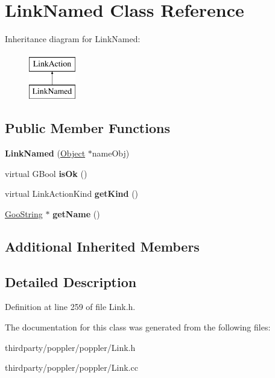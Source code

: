 \hypertarget{class_link_named}{}\section{Link\+Named Class Reference}
\label{class_link_named}
Inheritance diagram for Link\+Named\+:\begin{figure}[H]
\begin{center}
\leavevmode
\includegraphics[height=2.000000cm]{class_link_named}
\end{center}
\end{figure}
\subsection*{Public Member Functions}
\begin{DoxyCompactItemize}
\item 
\mbox{\label{class_link_named_a803f19a64f1d51534a958557f318be7a}} 
{\bfseries Link\+Named} (\hyperlink{class_object}{Object} $\ast$name\+Obj)
\item 
\mbox{\label{class_link_named_a0ac6727e5287e0c540b0cf0cd50b3847}} 
virtual G\+Bool {\bfseries is\+Ok} ()
\item 
\mbox{\label{class_link_named_a9c34963a477ea33074d68f99ce20d3d5}} 
virtual Link\+Action\+Kind {\bfseries get\+Kind} ()
\item 
\mbox{\label{class_link_named_a01d3cc3773aea04074cc79b15329ad84}} 
\hyperlink{class_goo_string}{Goo\+String} $\ast$ {\bfseries get\+Name} ()
\end{DoxyCompactItemize}
\subsection*{Additional Inherited Members}


\subsection{Detailed Description}


Definition at line 259 of file Link.\+h.



The documentation for this class was generated from the following files\+:\begin{DoxyCompactItemize}
\item 
thirdparty/poppler/poppler/Link.\+h\item 
thirdparty/poppler/poppler/Link.\+cc\end{DoxyCompactItemize}
